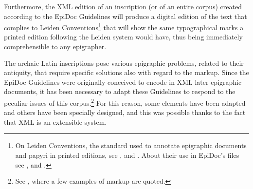 \documentclass[amsthm,ebook]{saparticle}
\begin{document}
Furthermore, the XML edition of an inscription (or of an entire corpus) created according to the EpiDoc Guidelines will
produce a digital edition of the text that complies to Leiden Conventions\footnote{On Leiden Conventions, the standard
used to annotate epigraphic documents and papyri in printed editions, see \citet{krummrey_criteri_1980}, \citet{panciera_segni_2006} and \citet{panciera_i_2006}. About their use in EpiDoc's files see \citet{elliot_conformance_2007}, \citet[229]{burnard_electronic_2006} and \citet[105]{bodard_epidoc:_2009}.} that will show the
same typographical marks a printed edition following the Leiden system would have, thus being immediately
comprehensible to any epigrapher.

The archaic Latin inscriptions pose various epigraphic problems, related to their antiquity, that require specific
solutions also with regard to the markup. Since the EpiDoc Guidelines were originally conceived to encode in XML later
epigraphic documents, it has been necessary to adapt these Guidelines to respond to the peculiar issues of this
corpus.\footnote{See \citet[162-167]{sarullo_ledizione_2011}, where a few examples of markup are quoted. } For this reason, some elements
have been adapted and others have been specially designed, and this was possible thanks to the fact that XML is an
extensible system.
\end{document}
